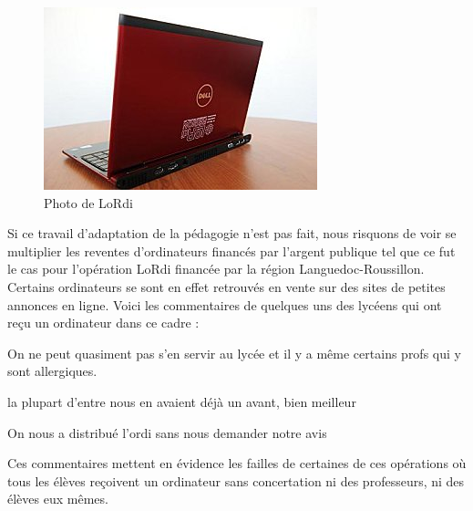 \begin{figure}[H]
  \begin{center}
    \includegraphics[width=\textwidth]{../resources/illustrations/lordi}
    \caption{Photo de LoRdi}
  \end{center}
\end{figure}

Si ce travail d'adaptation de la pédagogie n'est pas fait, nous
risquons de voir se multiplier les reventes d'ordinateurs financés par
l'argent publique tel que ce fut le cas pour l'opération \og{}LoRdi\fg{} financée par la région
Languedoc-Roussillon. Certains ordinateurs se sont en effet retrouvés en
vente sur des sites de petites annonces en ligne. Voici les
commentaires de quelques uns des lycéens qui ont reçu un ordinateur dans ce cadre :

\begin{coolquote}
  On ne peut quasiment pas s'en servir au lycée et il y a même certains profs qui y sont allergiques.
\end{coolquote}

\begin{coolquote}
  la plupart d’entre nous en avaient déjà un avant, bien meilleur
\end{coolquote}

\begin{coolquote}
  On nous a distribué l’ordi sans nous demander notre avis
\end{coolquote}

Ces commentaires mettent en évidence les failles de certaines de ces opérations où tous les élèves reçoivent un ordinateur sans concertation ni des professeurs, ni des élèves eux mêmes. 


